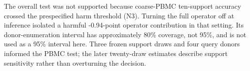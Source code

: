 The overall test was not supported because coarse-PBMC ten-support accuracy crossed the prespecified harm threshold (N3). Turning the full operator off at inference isolated a harmful -0.94-point operator contribution in that setting. Its donor-enumeration interval has approximately 80\% coverage, not 95\%, and is not used as a 95\% interval here. Three frozen support draws and four query donors informed the PBMC test; the later twenty-draw estimates describe support sensitivity rather than overturning the decision.